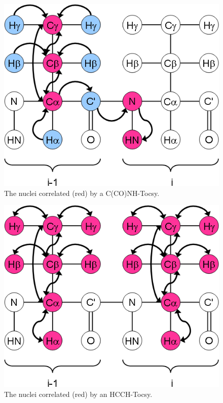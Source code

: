 \begin{figure}
  \includegraphics[scale=0.75]{figures/ccpn_cconhtocsy}
  \caption[The nuclei correlated by a C(CO)NH-Tocsy.]
          {The nuclei correlated (red) by a C(CO)NH-Tocsy.}
  \label{ccpn_cconhtocsy}
\end{figure}

\begin{figure}
  \includegraphics[scale=0.75]{figures/ccpn_hcchtocsy}
  \caption[The nuclei correlated by an HCCH-Tocsy.]
          {The nuclei correlated (red) by an HCCH-Tocsy.}
  \label{ccpn_hcchtocsy}
\end{figure}


